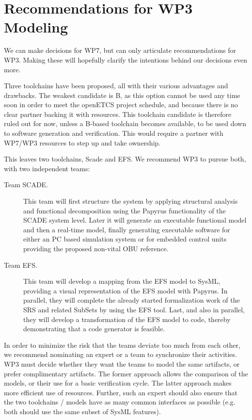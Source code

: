 \pagebreak

\section{Recommendations for WP3 Modeling}

We can make decisions for WP7, but can only articulate recommendations for WP3.  Making these will hopefully clarify the intentions behind our decisions even more.

Three toolchains have been proposed, all with their various advantages and drawbacks. The weakest candidate is B, as this option cannot be used any time soon in order to meet the openETCS project schedule, and because there is no clear partner backing it with resources.  This toolchain candidate is therefore ruled out for now, unless a B-based  toolchain becomes available, to be used down to software generation and verification.  This would require a partner with WP7/WP3 resources to step up and take ownership.

This leaves two toolchains, Scade and EFS.  We recommend WP3 to pursue both, with two independent teams:

\begin{description}

\item[Team SCADE.] This team will first structure the system by applying structural analysis and functional decomposition using the Papyrus functionality of the SCADE system level.  Later it will generate an executable functional model and then a real-time model, finally generating executable software for either an PC based simulation system or for embedded control units providing the proposed non-vital OBU reference.

\item[Team EFS.] This team will develop a mapping from the EFS model to SysML, providing a visual representation of the EFS model with Papyrus. In parallel, they will complete the already started formalization work of the SRS and related SubSets by using the EFS tool.  Last, and also in parallel, they will develop a transformation of the EFS model to code, thereby demonstrating that a code generator is feasible.

\end{description}

In order to minimize the risk that the teams deviate too much from each other, we recommend nominating an expert or a team to synchronize their activities.  WP3 must decide whether they want the teams to model the same artifacts, or prefer complimentary artifacts.  The former approach allows the comparison of the models, or their use for a basic verification cycle.  The latter approach makes more efficient use of resources. Further, such an expert should also ensure that the two toolchains / models have as many common interfaces as possible (e.g. both should use the same subset of SysML features).

